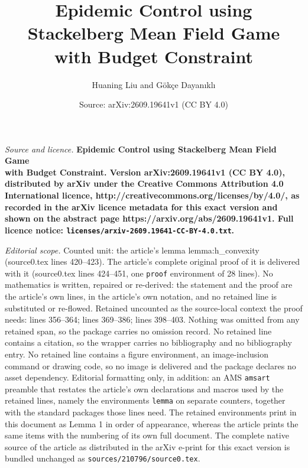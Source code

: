 \documentclass[10pt,a4paper]{amsart}
\title{\LARGE \bf Epidemic Control using Stackelberg Mean Field Game \\ with Budget Constraint}
\author{Huaning Liu and G\"ok{\c c}e Dayan{\i}kl{\i}}
\date{Source: arXiv:2609.19641v1 (CC BY 4.0)}
\begin{document}
\maketitle

\noindent\emph{Source and licence.} \LARGE \bf Epidemic Control using Stackelberg Mean Field Game \\ with Budget Constraint. Version arXiv:2609.19641v1 (CC BY 4.0), distributed by arXiv under the Creative Commons Attribution 4.0 International licence, http://creativecommons.org/licenses/by/4.0/, as recorded in the arXiv licence metadata for this exact version and shown on the abstract page https://arxiv.org/abs/2609.19641v1. Full licence notice: \texttt{licenses/arxiv-2609.19641-CC-BY-4.0.txt}.\par\smallskip

\noindent\textit{Editorial scope.} Counted unit: the article's lemma lemma:h\_convexity (source0.tex lines 420--423). The article's complete original proof of it is delivered with it (source0.tex lines 424--451, one \texttt{proof} environment of 28 lines). No mathematics is written, repaired or re-derived: the statement and the proof are the article's own lines, in the article's own notation, and no retained line is substituted or re-flowed.  Retained uncounted as the source-local context the proof needs: lines 356--364; lines 369--386; lines 398--403.  Nothing was omitted from any retained span, so the package carries no omission record.  No retained line contains a citation, so the wrapper carries no bibliography and no bibliography entry.  No retained line contains a figure environment, an image-inclusion command or drawing code, so no image is delivered and the package declares no asset dependency.  Editorial formatting only, in addition: an AMS \texttt{amsart} preamble that restates the article's own declarations and macros used by the retained lines, namely the environments \texttt{lemma} on separate counters, together with the standard packages those lines need.  The retained environments print in this document as Lemma 1 in order of appearance, whereas the article prints the same items with the numbering of its own full document.  The complete native source of the article as distributed in the arXiv e-print for this exact version is bundled unchanged as \texttt{sources/210796/source0.tex}.
\end{document}
